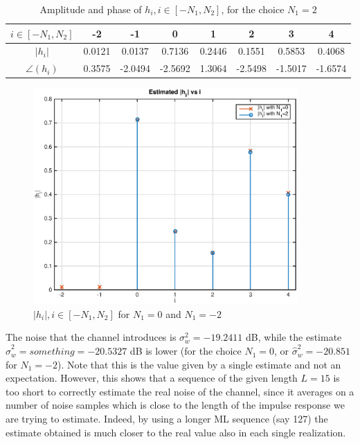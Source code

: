 \documentclass[10pt]{article}
\begin{document}
\begin{table}
	\centering
	\begin{tabular}{c|c|c|c|c|c|c|c}
		$i \in [-N_1, N_2]$ & -2 & -1 & 0 & 1 & 2 & 3 & 4 \\ \hline
		$|h_i|$ 	&	0.0121  &  0.0137  &  0.7136   & 0.2446  &  0.1551  &  0.5853  &  0.4068 \\
		$\angle(h_i)$ &	0.3575  & -2.0494  & -2.5692   & 1.3064  & -2.5498  & -1.5017  & -1.6574 \\
	\end{tabular}
	\caption{Amplitude and phase of $h_i, i \in [-N_1, N_2]$, for the choice $N_1 = 2$}
	\label{table:h2}
\end{table}

\begin{figure}
 \centering
 \includegraphics[width = 0.9\textwidth]{hi_p1}
 \caption{$|h_i|, i \in [-N_1, N_2]$ for $N_1 = 0$ and $N_1 = -2$}
 \label{fig:h1p1}
\end{figure}

The noise that the channel introduces is $\sigma_w^2 = -19.2411$ dB, while the estimate $\hat{\sigma}_w^2 = something = -20.5327$ dB is lower (for the choice $N_1 = 0$, or $\hat{\sigma}_w^2 = -20.851$ for $N_1 = -2$). Note that this is the value given by a single estimate and not an expectation. However, this shows that a sequence of the given length $L = 15$ is too short to correctly estimate the real noise of the channel, since it averages on a number of noise samples which is close to the length of the impulse response we are trying to estimate. Indeed, by using a longer ML sequence (say 127) the estimate obtained is much closer to the real value also in each single realization. 
\end{document}
